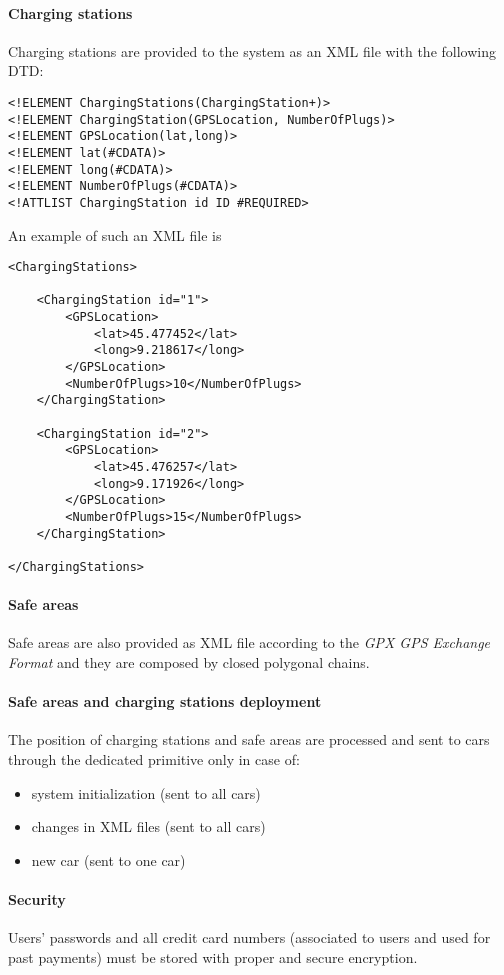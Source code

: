 \paragraph{Charging stations}Charging stations are provided to the system as an XML file with the following DTD:
\lstset{language=XML,frame=false}
\begin{lstlisting}
<!ELEMENT ChargingStations(ChargingStation+)>
<!ELEMENT ChargingStation(GPSLocation, NumberOfPlugs)>
<!ELEMENT GPSLocation(lat,long)>
<!ELEMENT lat(#CDATA)>
<!ELEMENT long(#CDATA)>
<!ELEMENT NumberOfPlugs(#CDATA)>
<!ATTLIST ChargingStation id ID #REQUIRED>
\end{lstlisting}
An example of such an XML file is 
\begin{lstlisting}
<ChargingStations>

	<ChargingStation id="1">
		<GPSLocation>
			<lat>45.477452</lat>
			<long>9.218617</long>
		</GPSLocation>
		<NumberOfPlugs>10</NumberOfPlugs>
	</ChargingStation>
	
	<ChargingStation id="2">
		<GPSLocation>
			<lat>45.476257</lat>
			<long>9.171926</long>
		</GPSLocation>
		<NumberOfPlugs>15</NumberOfPlugs>
	</ChargingStation>
	
</ChargingStations>
\end{lstlisting}

\paragraph{Safe areas}Safe areas are also provided as XML file according to the \emph{GPX GPS Exchange Format} \cite{gpx} and they are composed by closed polygonal chains.

\paragraph{Safe areas and charging stations deployment}The position of charging stations and safe areas are processed and sent to cars through the dedicated primitive only in case of:
\begin{itemize}
	\item system initialization (sent to all cars)
	\item changes in XML files (sent to all cars)
	\item new car (sent to one car)
\end{itemize}

\paragraph{Security}Users' passwords and all credit card numbers (associated to users and used for past payments) must be stored with proper and secure encryption.


